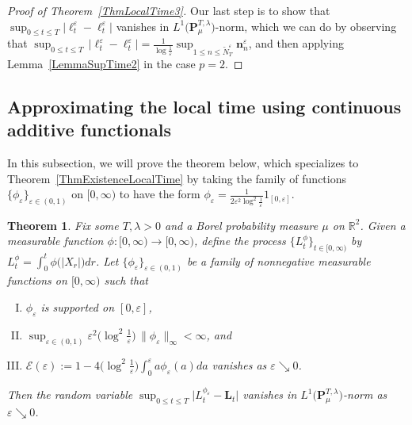 \documentclass[10pt]{article}
\numberwithin{equation}{section}
\newtheorem{theorem}{Theorem}[section]
\theoremstyle{definition}
\newcommand{\R}{{\mathbb R}}
\begin{document}
\begin{proof}[Proof of Theorem~\ref{ThmLocalTime3}]
Our last step is to show that  $\sup_{0\leq t\leq T}\big|\ell_t^{\varepsilon}-\boldsymbol{\ell}_t^{\varepsilon}\big| $
vanishes in $L^1\big(\mathbf{P}^{T,\lambda}_{\mu}\big)$-norm, which we can do by observing that $\sup_{0\leq t\leq T}\,\big|\ell_t^{\varepsilon}- \boldsymbol{\ell}_t^{\varepsilon} \big| =\frac{1}{\log \frac{1}{\varepsilon}  } \sup_{1\leq n \leq\widetilde{N}_T^{\varepsilon}   }  \mathbf{n}^{\varepsilon}_n $, and then applying Lemma~\ref{LemmaSupTime2} in the case $p=2$.  
\end{proof}


\subsection{Approximating the  local time  using continuous additive functionals}\label{SectionLocalTimeAdditive}




In this subsection, we will prove the theorem below, which specializes to Theorem~\ref{ThmExistenceLocalTime} by taking the family of functions $\{\phi_{\varepsilon}\}_{\varepsilon \in (0,1)}$ on $[0,\infty)$ to have the form $\phi_{\varepsilon}=\frac{1}{2\varepsilon^2\log^2\frac{1}{\varepsilon} }1_{[0,\varepsilon]} $.

\begin{theorem}\label{TheoremLocalTimeAdditive} Fix some $T, \lambda>0$ and a Borel probability measure $\mu$ on $\R^2$.  Given  a measurable function $\phi:[0,\infty)\rightarrow [0,\infty)$,   define the process $\{ L_t^{\phi}  \}_{t\in [0,\infty)}$ by 
$L_t^{\phi}=\int_0^t\phi\big(|X_r|\big)dr$.   Let  $\{\phi_{\varepsilon}\}_{\varepsilon\in (0,1)}$ be a family of nonnegative measurable functions on $[0,\infty)$ such that
\begin{enumerate}[(I)]

\item  $\phi_{\varepsilon}$ is supported on $[0,\varepsilon ]$,

\item $\sup_{\varepsilon \in (0,1)}  \varepsilon^2  \big( \log^2  \frac{1}{\varepsilon} \big) \,\|\phi_{\varepsilon}\|_{\infty} < \infty$, and

\item $ \mathcal{E}(\varepsilon):=1-  4 \big(\log^2 \frac{1}{\varepsilon}\big) \int_{0}^{\varepsilon} a\phi_{\varepsilon}(a)da $ vanishes as $\varepsilon \searrow 0$.

\end{enumerate}
Then   the random variable $\sup_{0\leq t\leq T}\big| L_t^{\phi_\varepsilon} - \mathbf{L}_t \big|  $ vanishes in $L^1\big(\mathbf{P}_{\mu}^{T,\lambda}\big)$-norm as $\varepsilon\searrow 0$.


\end{theorem}
\end{document}
